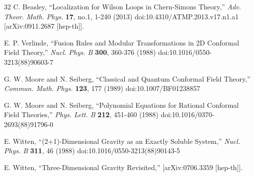 \begin{thebibliography}{32}
 C. Beasley, ``Localization for Wilson Loops in Chern-Simons Theory,'' \emph{Adv. Theor. Math. Phys.} \textbf{17}, no.1, 1-240 (2013) doi:10.4310/ATMP.2013.v17.n1.a1 [arXiv:0911.2687 [hep-th]].

 E. P. Verlinde, ``Fusion Rules and Modular Transformations in 2D Conformal Field Theory,'' \emph{Nucl. Phys. B} \textbf{300}, 360-376 (1988) doi:10.1016/0550-3213(88)90603-7

 G. W. Moore and N. Seiberg, ``Classical and Quantum Conformal Field Theory,'' \emph{Commun. Math. Phys.} \textbf{123}, 177 (1989) doi:10.1007/BF01238857

 G. W. Moore and N. Seiberg, ``Polynomial Equations for Rational Conformal Field Theories,'' \emph{Phys. Lett. B} \textbf{212}, 451-460 (1988) doi:10.1016/0370-2693(88)91796-0

 E. Witten, ``(2+1)-Dimensional Gravity as an Exactly Soluble System,'' \emph{Nucl. Phys. B} \textbf{311}, 46 (1988) doi:10.1016/0550-3213(88)90143-5

 E. Witten, ``Three-Dimensional Gravity Revisited,'' [arXiv:0706.3359 [hep-th]].

\end{thebibliography}

